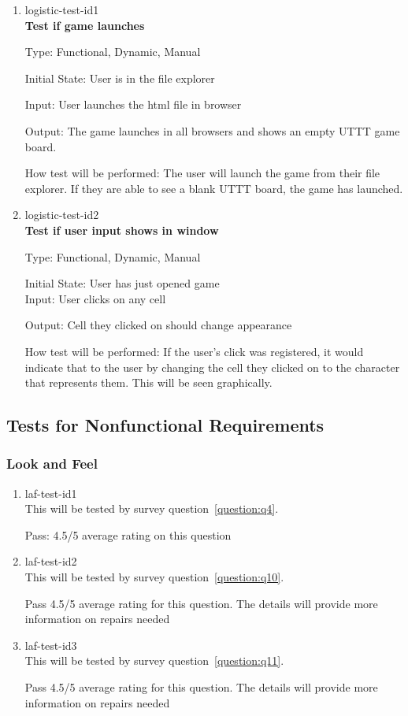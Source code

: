\documentclass[12pt, titlepage]{article}
\begin{document}
\begin{enumerate}

\item{logistic-test-id1\\}
\textbf{Test if game launches}

Type: Functional, Dynamic, Manual
					
Initial State: User is in the file explorer
					
Input: User launches the html file in browser
					
Output: The game launches in all browsers and shows an empty UTTT game board.
					
How test will be performed: The user will launch the game from their file
explorer. If they are able to see a blank UTTT board, the game has launched.

\item{logistic-test-id2\\}
\textbf{Test if user input shows in window}

Type: Functional, Dynamic, Manual
					
Initial State: User has just opened game\\ %
					
Input: User clicks on any cell
					
Output: Cell they clicked on should change appearance
					
How test will be performed: If the user's click was registered, it would
indicate that to the user by changing the cell they clicked on to the
character that represents them. This will be seen graphically.

\end{enumerate}

\subsection{Tests for Nonfunctional Requirements}

\subsubsection{Look and Feel} \label{LookAndFeel}

\begin{enumerate}

\item{laf-test-id1\\}
This will be tested by survey question~\ref{question:q4}.

Pass: 4.5/5 average rating on this question
\item{laf-test-id2\\}
This will be tested by survey question~\ref{question:q10}.

Pass 4.5/5 average rating for this question. The details will provide more
information on repairs needed
\item{laf-test-id3\\}
This will be tested by survey question~\ref{question:q11}.

Pass 4.5/5 average rating for this question. The details will provide more
information on repairs needed
\end{enumerate}
\end{document}
